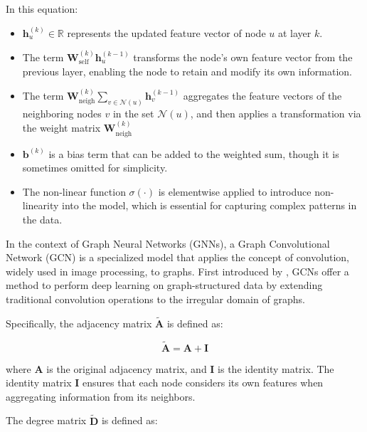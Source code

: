 In this equation:
\begin{itemize}
    \item \( \mathbf{h}_u^{(k)} \in \mathbb{R} \) represents the updated feature vector of node \( u \) at layer \( k \).
    \item The term \( \mathbf{W}_{\text{self}}^{(k)} \mathbf{h}_u^{(k-1)} \) transforms the node's own feature vector from the previous layer, enabling the node to retain and modify its own information. 
    \item The term \( \mathbf{W}_{\text{neigh}}^{(k)} \sum_{v \in \mathcal{N}(u)} \mathbf{h}_v^{(k-1)} \) aggregates the feature vectors of the neighboring nodes \( v \) in the set \( \mathcal{N}(u) \), and then applies a transformation via the weight matrix \( \mathbf{W}_{\text{neigh}}^{(k)} \) 
    \item \( \mathbf{b}^{(k)} \) is a bias term that can be added to the weighted sum, though it is sometimes omitted for simplicity. 
    \item  The non-linear function \( \sigma(\cdot) \) is elementwise applied  to introduce non-linearity into the model, which is essential for capturing complex patterns in the data.

\end{itemize}



In the context of Graph Neural Networks (GNNs), a Graph Convolutional Network (GCN) is a specialized model that applies the concept of convolution, widely used in image processing, to graphs. First introduced by \cite{Kipf:2016tc}, GCNs offer a method to perform deep learning on graph-structured data by extending traditional convolution operations to the irregular domain of graphs.

Specifically, the adjacency matrix \( \tilde{\mathbf{A}} \) is defined as:

\begin{equation}
 \tilde{\mathbf{A}} = \mathbf{A} + \mathbf{I}   
    \label{eq:modified_adjacency_matrix}
\end{equation}

\noindent where \( \mathbf{A} \) is the original adjacency matrix, and \( \mathbf{I} \) is the identity matrix. The identity matrix \( \mathbf{I} \) ensures that each node considers its own features when aggregating information from its neighbors.

The degree matrix \( \tilde{\mathbf{D}} \) is defined as:

